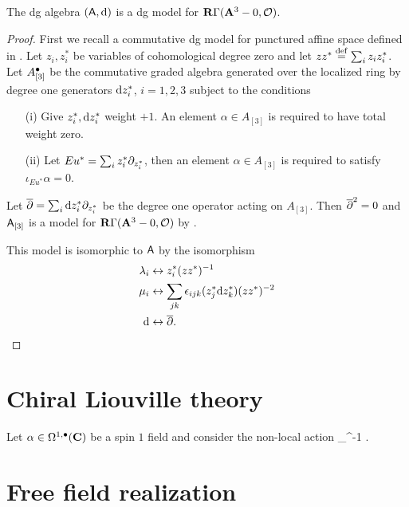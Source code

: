 \documentclass[11pt]{amsart}
\begin{document}
\begin{prop}
The dg algebra $(\mathsf A,{\rm d})$ is a dg model for $\mathbf{R} \Gamma({\mathbf{A}}^3 - 0, \mathcal O)$.
\end{prop}
\begin{proof}
First we recall a commutative dg model for punctured affine space defined in \cite{FHK}.
Let $z_i,z_i^*$ be variables of cohomological degree zero and let $z z^* \overset{\rm def}{=} \sum_i z_i z_i^*$.
Let $A_{[3]}^\bullet$ be the commutative graded algebra generated over the localized ring
\beqn
\C[z_i,z_i^*] [(z z^*)^{-1}]
\eeqn
by degree one generators ${\rm d} z_i^*$, $i=1,2,3$ subject to the conditions
\begin{itemize}
\item[(i)] Give $z^*_i, {\rm d} z^*_i$ weight $+1$.
An element $\alpha \in A_{[3]}$ is required to have total weight zero.
\item[(ii)] Let $Eu^* = \sum_i z_i^* \partial_{z_i^*}$, then an element $\alpha \in A_{[3]}$ is required to satisfy $\iota_{Eu^*} \alpha = 0$.
\end{itemize}
Let $\overline{\partial} = \sum_i {\rm d} z_i^* \partial_{z_i^*}$ be the degree one operator acting on $A_{[3]}$.
Then $\overline{\partial}^2 = 0$ and $\mathsf A_{[3]}$ is a model for $\mathbf{R} \Gamma({\mathbf{A}}^3 - 0, \mathcal O)$ by \cite{FHK}.

This model is isomorphic to $\mathsf A$ by the isomorphism
\begin{align*}
\lambda_i & \leftrightarrow z_i^* (zz^*)^{-1} \\
\mu_i & \leftrightarrow \sum_{jk} {\epsilon}_{ijk} (z_j^* {\rm d} z_k^*) (z z^*)^{-2}  \\
{\rm d} & \leftrightarrow \overline{\partial} .
\end{align*}

\end{proof}



\section{Chiral Liouville theory}

Let $\alpha \in \Omega^{1,\bullet}(\mathbf{C})$ be a spin $1$ field and consider the non-local action
\beqn
\int_\C \alpha \dbar \del^{-1} \alpha .
\eeqn

\section{Free field realization}
\end{document}
